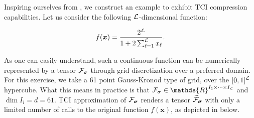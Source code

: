 \begin{example}
Inspiring ourselves from \cite{Fernandez2024}, we construct an example to exhibit TCI compression capabilities. Let us consider the following $\mathcal{L}$-dimensional function: 

\begin{equation}
	f(\boldsymbol{x}) = 
   \frac{2^{\mathcal{L}}}{1 + 2 \sum^{\mathcal{L}}_{\ell=1} x_\ell} .
   \label{eq:Ldimfunc}
\end{equation}

As one can easily understand, such a continuous function can be numerically represented by a tensor $\mathcal{F}_{\boldsymbol{\sigma}}$ through grid discretization over a preferred domain. For this exercise, we take a 61 point Gauss-Kronod type of grid, over the $[0,1]^{\mathcal{L}}$ hypercube. What this means in practice is that $\mathcal{F}_{\bsigma} \in \mathds{R}^{I_1\times\dots\times I_\mL}$ and $\dim I_i = d = 61$. TCI approximation of $\mathcal{F}_{\boldsymbol{\sigma}}$ renders a tensor $\widetilde{\mathcal{F}}_{\boldsymbol{\sigma}}$ with only a limited number of calls to the original function $f(\boldsymbol{x})$, as depicted in  below. 


\end{example}
